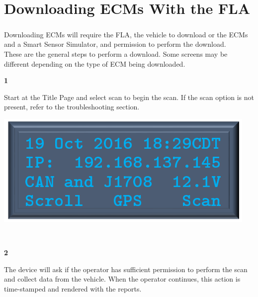 \documentclass[11pt, oneside]{book}
\begin{document}
\chapter{Downloading ECMs With the FLA}
\paragraph{  }
Downloading ECMs will require the FLA, the vehicle to download or the ECMs and a Smart Sensor Simulator, and permission to perform the download.
\\
These are the general steps to perform a download. Some screens may be different depending on the type of ECM being downloaded.
\\[\baselineskip]
\noindent\begin{minipage}{0.45\textwidth}%
\begin{center}
\textbf{1}\\[\baselineskip]
\end{center}
Start at the Title Page and select scan to begin the scan. If the scan option is not present, refer to the troubleshooting section.
\end{minipage}%
\hfill%
\begin{minipage}{0.45\textwidth}
\includegraphics[width=\linewidth]{../media/pstricks_files/01_main_screen_gps}
\end{minipage}
\\[\baselineskip]\noindent\begin{minipage}{0.45\textwidth}%
\begin{center}
\textbf{2}\\[\baselineskip]
\end{center}
The device will ask if the operator has sufficient permission to perform the scan and collect data from the vehicle. When the operator continues, this action is time-stamped and rendered with the reports.
\end{minipage}%
\end{document}
